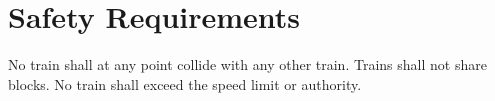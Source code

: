 \documentclass{scrreprt}
\begin{document}
\section{Safety Requirements}
No train shall at any point collide with any other train. Trains shall not share blocks. No train shall exceed
the speed limit or authority.






\end{document}
